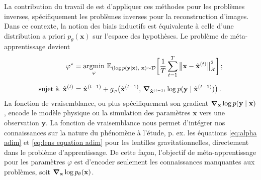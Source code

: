 La contribution du travail de \citet{Putzky2017} est d'appliquer ces méthodes pour les problèmes inverses, spécifiquement les 
problèmes inverses pour la reconstruction d'images. Dans ce contexte, la notion des biais inductifs est 
équivalente à celle d'une distribution a priori $p_\theta(\mathbf{x})$ sur l'espace 
des hypothèses. Le problème de méta-apprentissage devient
\begin{equation}\label{eq:loss intro}
        \begin{aligned}
                \varphi^{\star} &= \underset{\varphi}{\mathrm{argmin}}\,\, 
        \mathbb{E}_{(\log p(\mathbf{y} \mid \mathbf{x}),\,\, \mathbf{x}) \sim \mathcal{D}} 
        \bigg[ \frac{1}{T} \sum_{t=1}^{T} \big\lVert \mathbf{x} - \hat{\mathbf{x}}^{(t)} \big\rVert^{2}_{\mathcal{X}}  \bigg]\,; \\[1.5ex]
        \text{sujet à}\,\,\,\hat{\mathbf{x}}^{(t)} &= 
        \hat{\mathbf{x}}^{(t-1)} + g_\varphi\big(\hat{\mathbf{x}}^{(t-1)},\, \grad_{\hat{\mathbf{x}}^{(t-1)}} \log p(\mathbf{y} \mid \hat{\mathbf{x}}^{(t-1)}) \big)\, .
        \end{aligned}
\end{equation} 
La fonction de vraisemblance, ou plus spécifiquement son gradient $\grad_{\mathbf{x}}\log p(\mathbf{y} \mid \mathbf{x})$, 
encode le modèle physique ou la simulation des paramètres $\mathbf{x}$ vers une observation $\mathbf{y}$.
La fonction de vraisemblance nous permet d'intégrer nos connaissances sur la nature du phénomène à l'étude, 
p. ex. les équations \eqref{eq:alpha adim} et \eqref{eq:lens equation adim} 
pour les lentilles gravitationnelles, directement dans le problème d'apprentissage.
De cette façon, l'objectif de méta-apprentissage pour les paramètres $\varphi$ est d'encoder seulement 
les connaissances manquantes aux problèmes, soit $\grad_{\mathbf{x}}\log p_\theta(\mathbf{x})$.

